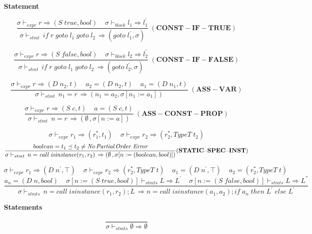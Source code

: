 \documentclass[12pt, a4paper]{report}
\newcommand{\centerfrac}[4]{
    $$ #2 $$
    $$
        \dfrac { #3 } { #4 } #1
    $$
}
\newcommand{\negsp}[1]{
    \!\!#1\!\!
}
\newcommand{\gap}{ \;\;\;\; }
\begin{document}
\textbf{Statement}

$$
\dfrac{
    \sigma \vdash_{expr} r \Rightarrow (S \; true, bool)
    \gap
    \sigma \vdash_{block} l_1 \Rightarrow l_1^{'}
}{
    \sigma \vdash_{stmt} \, \mathit{if}\;r\;\mathit{goto}\;l_1\;\mathit{goto}\;l_2\,
    \Rightarrow (\mathit{goto} \; l_1^{'}, \sigma)
} \; (\mathbf{CONST\negsp{-}IF\negsp{-}TRUE})
$$

$$
\dfrac{
    \sigma \vdash_{expr} r \Rightarrow (S \; false, bool)
    \gap
    \sigma \vdash_{block} l_2 \Rightarrow l_2^{'}
}{
    \sigma \vdash_{stmt} \, \mathit{if}\;r\;\mathit{goto}\;l_1\;\mathit{goto}\;l_2\,
    \Rightarrow (\mathit{goto} \; l_2^{'}, \sigma)
} \; (\mathbf{CONST\negsp{-}IF\negsp{-}FALSE})
$$

$$
\dfrac{
    \sigma \vdash_{expr} r \Rightarrow (D \; n_2, t)
    \gap
    a_2 = (D\;n_2, t)
    \gap
    a_1 = (D\;n_1, t)
}{
    \sigma \vdash_{stmt}
    \, n_1 = r \, \Rightarrow (n_1 = a_2, \sigma[n_1 := a_1])
} \; (\mathbf{ASS\negsp{-}VAR})
$$

$$
\dfrac{
    \sigma \vdash_{expr} r \Rightarrow (S\;c, t)
    \gap
    a = (S \; c, t)
}{
    \sigma \vdash_{stmt}
    \, n = r \, \Rightarrow (\emptyset\,, \sigma[n := a])
} \; (\mathbf{ASS\negsp{-}CONST\negsp{-}PROP})
$$

\centerfrac{(\mathbf{STATIC\negsp{-}SPEC\negsp{-}INST})}{
    \sigma \vdash_{expr} r_1 \Rightarrow (r_1^{*}, t_1)
        \gap
    \sigma \vdash_{expr} r_2 \Rightarrow (r_2^{*}, TypeT \; t_2)
}{
    boolean = t_1 \preceq t_2 \ne \textit{No\,Partial\,Order Error}
}{
    \sigma \vdash_{stmt}
     \, n = \mathit{call}\; \mathit{isinstance}(r_1, r_2) \,
    \Rightarrow (\emptyset\,, \sigma[n := (boolean, bool)])
}

\centerfrac{}{
    \sigma \vdash_{expr} r_1 \Rightarrow (D \; n^{'}, \top)
    \gap
    \sigma \vdash_{expr} r_2 \Rightarrow (r_2^{*}, TypeT \; t)
    \gap a_1 = (D \; n^{'}, \top)
    \gap a_2 = (r_2^{*}, TypeT \; t)
}{
    a_n = (D \; n, bool)
    \gap
    \sigma[n := (S\;true, bool)] \vdash_{stmts} L \Rightarrow L^{'}
    \gap
    \sigma[n := (S\;false, bool)] \vdash_{stmts} L \Rightarrow L^{''}
}{
    \sigma \vdash_{stmts}
     \, n = \mathit{call}\; \mathit{isinstance}(r_1, r_2) ; L \,
    \Rightarrow
    n = \mathit{call} \; \mathit{isinstance}(a_1, a_2) ;
    \mathit{if}\; a_n \; \mathit{then} \; L^{'} \; \mathit{else} \; L^{'}
}

\textbf{Statements}

$$
\dfrac{}{
    \sigma \vdash_{stmts} \emptyset \Rightarrow \emptyset
}
$$
\end{document}
